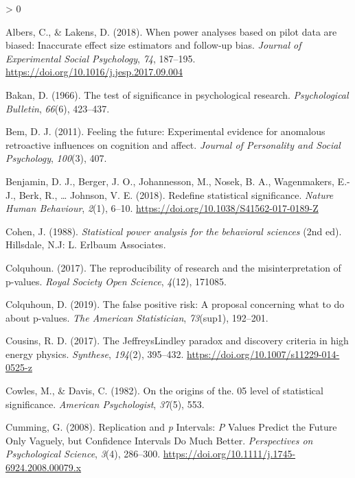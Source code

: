 \documentclass[
  english,
  ,jou,floatsintext]{apa6}
\newlength{\cslhangindent}
\newenvironment{CSLReferences}[2] %
 {%
  \setlength{\parindent}{0pt}
  \ifodd #1 \everypar{\setlength{\hangindent}{\cslhangindent}}\ignorespaces\fi
  \ifnum #2 > 0
  \setlength{\parskip}{#2\baselineskip}
  \fi
 }%
 {}
\begin{document}
\hypertarget{refs}{}
\begin{CSLReferences}{1}{0}
\leavevmode\hypertarget{ref-albers_when_2018}{}%
Albers, C., \& Lakens, D. (2018). When power analyses based on pilot data are biased: {Inaccurate} effect size estimators and follow-up bias. \emph{Journal of Experimental Social Psychology}, \emph{74}, 187--195. \url{https://doi.org/10.1016/j.jesp.2017.09.004}

\leavevmode\hypertarget{ref-bakan_test_1966}{}%
Bakan, D. (1966). The test of significance in psychological research. \emph{Psychological Bulletin}, \emph{66}(6), 423--437.

\leavevmode\hypertarget{ref-bem2011feeling}{}%
Bem, D. J. (2011). Feeling the future: Experimental evidence for anomalous retroactive influences on cognition and affect. \emph{Journal of Personality and Social Psychology}, \emph{100}(3), 407.

\leavevmode\hypertarget{ref-benjamin_redefine_2018}{}%
Benjamin, D. J., Berger, J. O., Johannesson, M., Nosek, B. A., Wagenmakers, E.-J., Berk, R., \ldots{} Johnson, V. E. (2018). Redefine statistical significance. \emph{Nature Human Behaviour}, \emph{2}(1), 6--10. \url{https://doi.org/10.1038/S41562-017-0189-Z}

\leavevmode\hypertarget{ref-cohen_statistical_1988}{}%
Cohen, J. (1988). \emph{Statistical power analysis for the behavioral sciences} (2nd ed). {Hillsdale, N.J}: {L. Erlbaum Associates}.

\leavevmode\hypertarget{ref-colquhoun2017reproducibility}{}%
Colquhoun. (2017). The reproducibility of research and the misinterpretation of p-values. \emph{Royal Society Open Science}, \emph{4}(12), 171085.

\leavevmode\hypertarget{ref-colquhoun2019false}{}%
Colquhoun, D. (2019). The false positive risk: A proposal concerning what to do about p-values. \emph{The American Statistician}, \emph{73}(sup1), 192--201.

\leavevmode\hypertarget{ref-cousins_jeffreyslindley_2017}{}%
Cousins, R. D. (2017). The {Jeffreys}{{Lindley}} paradox and discovery criteria in high energy physics. \emph{Synthese}, \emph{194}(2), 395--432. \url{https://doi.org/10.1007/s11229-014-0525-z}

\leavevmode\hypertarget{ref-cowles_origins_1982}{}%
Cowles, M., \& Davis, C. (1982). On the origins of the. 05 level of statistical significance. \emph{American Psychologist}, \emph{37}(5), 553.

\leavevmode\hypertarget{ref-cumming_replication_2008}{}%
Cumming, G. (2008). Replication and {\emph{p}} {Intervals}: {\emph{P}} {Values Predict} the {Future Only Vaguely}, but {Confidence Intervals Do Much Better}. \emph{Perspectives on Psychological Science}, \emph{3}(4), 286--300. \url{https://doi.org/10.1111/j.1745-6924.2008.00079.x}


\end{CSLReferences}
\end{document}
